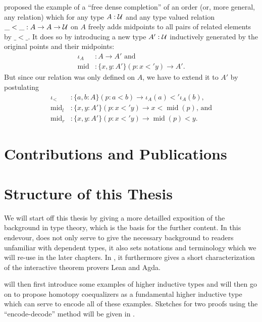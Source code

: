 \begin{example}
\citet{nordvallinductive} proposed the example of a ``free dense completion'' of
an order (or, more general, any relation) which for any type $A : \mathcal{U}$ and
any type valued relation $\_<\_ : A \to A \to \mathcal{U}$ on $A$ freely adds midpoints
to all pairs of related elements by $\_<\_$.
It does so by introducing a new type $A' : \mathcal{U}$ inductively generated by the
original points and their midpoints:
\begin{align*}
\iota_A		&: A \to A' \text{ and} \\
\mathop{mid}	&: \{x, y : A'\}(p : x <' y) \to A' \text{.}
\end{align*}
But since our relation was only defined on $A$, we have to extend it to $A'$ by
postulating
\begin{align*}
\iota_<		&: \{a, b : A\}(p : a < b) \to \iota_A(a) <' \iota_A(b) \text{,} \\
\mathop{mid}_l	&: \{x, y : A'\}(p : x <' y) \to x < \mathop{mid}(p) \text{, and} \\
\mathop{mid}_r	&: \{x, y : A'\}(p : x <' y) \to \mathop{mid}(p) < y \text{.}
\end{align*}
\end{example}

\section{Contributions and Publications}


\section{Structure of this Thesis}

We will start off this thesis by giving a more detailled exposition of the
background in type theory, which is the basis for the further content.
In this endevour,  does not only serve to give the necessary background
to readers unfamiliar with dependent types, it also sets notations and terminology
which we will re-use in the later chapters.
In , it furthermore gives a short characterization of the interactive
theorem provers Lean and Agda.

 will then first introduce some examples of higher inductive types
and will then go on to propose homotopy coequalizers as a fundamental higher
inductive type which can serve to encode all of these examples.
Sketches for two proofs using the ``encode-decode'' method will be given in
.

